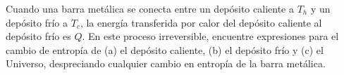 \item Cuando una barra metálica se conecta entre un depósito caliente a $T_h$ y un depósito frío a $T_c$, la energía transferida por calor del depósito caliente al depósito frío es $Q$. En este proceso irreversible, encuentre expresiones para el cambio de entropía de (a) el depósito caliente, (b) el depósito frío y (c) el Universo, despreciando cualquier cambio en entropía de la barra metálica.
